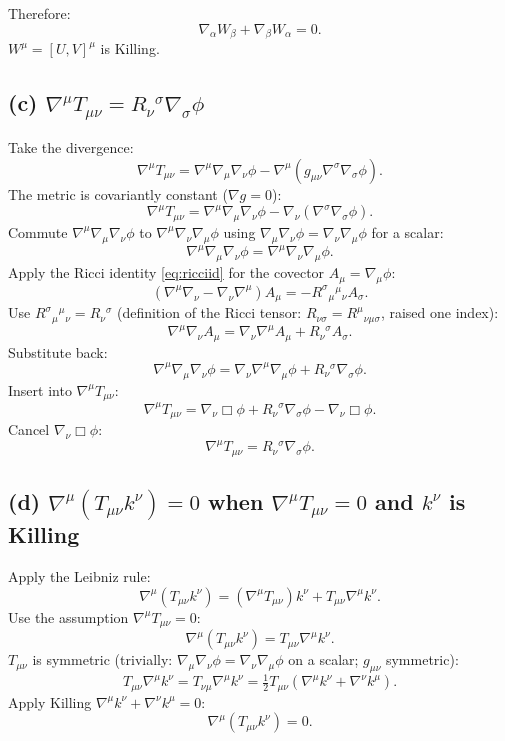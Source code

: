 \documentclass[11pt]{article}
\begin{document}
Therefore:
\[
\boxed{\;\nabla_\alpha W_\beta + \nabla_\beta W_\alpha = 0.\;}
\]
$W^\mu=[U,V]^\mu$ is Killing.

\subsection*{(c) $\nabla^\mu T_{\mu\nu} = R_\nu{}^\sigma\nabla_\sigma\phi$}

Take the divergence:
\[
\nabla^\mu T_{\mu\nu} = \nabla^\mu\nabla_\mu\nabla_\nu\phi - \nabla^\mu(g_{\mu\nu}\nabla^\sigma\nabla_\sigma\phi).
\]
The metric is covariantly constant ($\nabla g=0$):
\[
\nabla^\mu T_{\mu\nu} = \nabla^\mu\nabla_\mu\nabla_\nu\phi - \nabla_\nu(\nabla^\sigma\nabla_\sigma\phi).
\]
Commute $\nabla^\mu\nabla_\mu\nabla_\nu\phi$ to $\nabla^\mu\nabla_\nu\nabla_\mu\phi$ using $\nabla_\mu\nabla_\nu\phi=\nabla_\nu\nabla_\mu\phi$ for a scalar:
\[
\nabla^\mu\nabla_\mu\nabla_\nu\phi = \nabla^\mu\nabla_\nu\nabla_\mu\phi.
\]
Apply the Ricci identity \eqref{eq:ricciid} for the covector $A_\mu=\nabla_\mu\phi$:
\[
(\nabla^\mu\nabla_\nu - \nabla_\nu\nabla^\mu)A_\mu = -R^\sigma{}_{\mu}{}^\mu{}_\nu A_\sigma.
\]
Use $R^\sigma{}_{\mu}{}^\mu{}_\nu = R_\nu{}^\sigma$ (definition of the Ricci tensor: $R_{\nu\sigma}=R^\mu{}_{\nu\mu\sigma}$, raised one index):
\[
\nabla^\mu\nabla_\nu A_\mu = \nabla_\nu\nabla^\mu A_\mu + R_\nu{}^\sigma A_\sigma.
\]
Substitute back:
\[
\nabla^\mu\nabla_\mu\nabla_\nu\phi = \nabla_\nu\nabla^\mu\nabla_\mu\phi + R_\nu{}^\sigma\nabla_\sigma\phi.
\]
Insert into $\nabla^\mu T_{\mu\nu}$:
\[
\nabla^\mu T_{\mu\nu} = \nabla_\nu\Box\phi + R_\nu{}^\sigma\nabla_\sigma\phi - \nabla_\nu\Box\phi.
\]
Cancel $\nabla_\nu\Box\phi$:
\begin{equation}
\boxed{\;\nabla^\mu T_{\mu\nu} = R_\nu{}^\sigma\nabla_\sigma\phi.\;}
\label{eq:divT}
\end{equation}

\subsection*{(d) $\nabla^\mu(T_{\mu\nu}k^\nu)=0$ when $\nabla^\mu T_{\mu\nu}=0$ and $k^\nu$ is Killing}

Apply the Leibniz rule:
\[
\nabla^\mu(T_{\mu\nu}k^\nu) = (\nabla^\mu T_{\mu\nu})k^\nu + T_{\mu\nu}\nabla^\mu k^\nu.
\]
Use the assumption $\nabla^\mu T_{\mu\nu}=0$:
\[
\nabla^\mu(T_{\mu\nu}k^\nu) = T_{\mu\nu}\nabla^\mu k^\nu.
\]
$T_{\mu\nu}$ is symmetric (trivially: $\nabla_\mu\nabla_\nu\phi=\nabla_\nu\nabla_\mu\phi$ on a scalar; $g_{\mu\nu}$ symmetric):
\[
T_{\mu\nu}\nabla^\mu k^\nu = T_{\nu\mu}\nabla^\mu k^\nu = \tfrac12 T_{\mu\nu}(\nabla^\mu k^\nu + \nabla^\nu k^\mu).
\]
Apply Killing $\nabla^\mu k^\nu+\nabla^\nu k^\mu = 0$:
\[
\boxed{\;\nabla^\mu(T_{\mu\nu}k^\nu) = 0.\;}
\]
\end{document}
